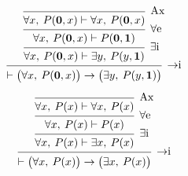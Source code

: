 \begin{exm}
	\[
		\begin{prooftree}
			\infer 0[Ax]{\forall x,\:P(\mathbf{0},x) \vdash \forall x,\:P(\mathbf{0},x)}
			\infer 1[$\forall$e]{\forall x,\:P(\mathbf{0},x) \vdash P(\mathbf{0},\mathbf{1})} %
			\infer 1[$\exists$i]{\forall x,\:P(\mathbf{0},x) \vdash \exists y,\: P(y, \mathbf{1})} %
			\infer 1[$\to$i]{\vdash \big(\forall x,\: P(\mathbf{0}, x)\big) \to \big(\exists y,\: P(y, \mathbf{1})\big)}
		\end{prooftree}
	\]
\end{exm}

\begin{exm}
	\[
		\begin{prooftree}
			\infer 0[Ax]{\forall x,\:P(x) \vdash \forall x,\:P(x)}
			\infer 1[$\forall$e]{\forall x,\:P(x) \vdash P(x)}
			\infer 1[$\exists$i]{\forall x,\:P(x) \vdash \exists x,\:P(x)}
			\infer 1[$\to$i]{\vdash \big(\forall x,\:P(x)\big) \to \big(\exists x,\: P(x)\big)}
		\end{prooftree}
	\] 
\end{exm}

